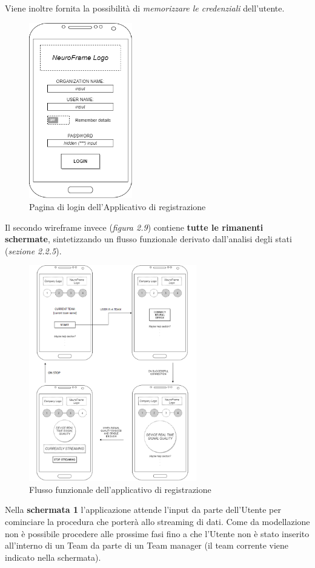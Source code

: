 \noindent Viene inoltre fornita la possibilità di \emph{memorizzare le credenziali} dell'utente.
\vspace{5mm}
\begin{figure}[H]
  \centering
  \includegraphics[width=0.4\textwidth]{img/wireframe_app_acquisizione_login.png}
  \caption{Pagina di login dell'Applicativo di registrazione}
\end{figure}
\vspace{5mm}
\noindent Il secondo wireframe invece (\emph{figura 2.9}) contiene {\bf tutte le rimanenti schermate}, sintetizzando un flusso funzionale derivato dall'analisi degli stati (\emph{sezione 2.2.5}).
\begin{figure}[H]
  \centering
  \includegraphics[width=0.65\textwidth]{img/wireframe_app_acquisizione_flusso.png}
  \caption{Flusso funzionale dell'applicativo di registrazione}
\end{figure}
\noindent Nella {\bf schermata 1} l'applicazione attende l'input da parte dell'Utente per cominciare la procedura che porterà allo streaming di dati.\newline
Come da modellazione non è possibile procedere alle prossime fasi fino a che l'Utente non è stato inserito all'interno di un Team da parte di un Team manager (il team corrente viene indicato nella schermata).\newline

